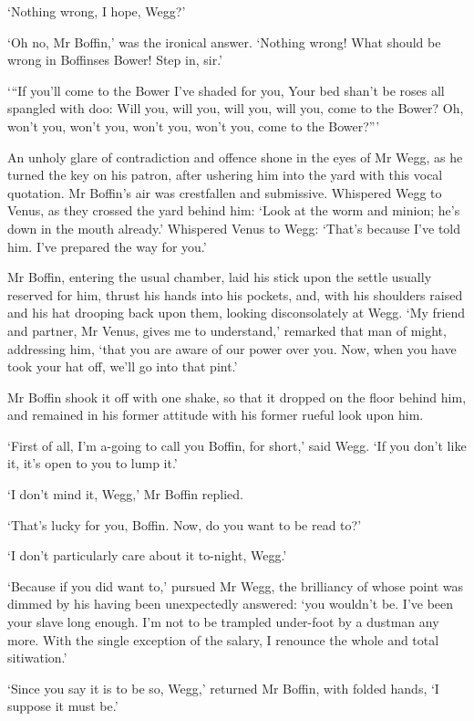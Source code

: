 ‘Nothing wrong, I hope, Wegg?’

‘Oh no, Mr Boffin,’ was the ironical answer. ‘Nothing wrong! What should
be wrong in Boffinses Bower! Step in, sir.’

     ‘“If you’ll come to the Bower I’ve shaded for you,
     Your bed shan’t be roses all spangled with doo:
     Will you, will you, will you, will you, come to the Bower?
     Oh, won’t you, won’t you, won’t you, won’t you, come to the
          Bower?”’

An unholy glare of contradiction and offence shone in the eyes of Mr
Wegg, as he turned the key on his patron, after ushering him into the
yard with this vocal quotation. Mr Boffin’s air was crestfallen and
submissive. Whispered Wegg to Venus, as they crossed the yard behind
him: ‘Look at the worm and minion; he’s down in the mouth already.’
Whispered Venus to Wegg: ‘That’s because I’ve told him. I’ve prepared
the way for you.’

Mr Boffin, entering the usual chamber, laid his stick upon the settle
usually reserved for him, thrust his hands into his pockets, and,
with his shoulders raised and his hat drooping back upon them, looking
disconsolately at Wegg. ‘My friend and partner, Mr Venus, gives me to
understand,’ remarked that man of might, addressing him, ‘that you are
aware of our power over you. Now, when you have took your hat off, we’ll
go into that pint.’

Mr Boffin shook it off with one shake, so that it dropped on the floor
behind him, and remained in his former attitude with his former rueful
look upon him.

‘First of all, I’m a-going to call you Boffin, for short,’ said Wegg.
‘If you don’t like it, it’s open to you to lump it.’

‘I don’t mind it, Wegg,’ Mr Boffin replied.

‘That’s lucky for you, Boffin. Now, do you want to be read to?’

‘I don’t particularly care about it to-night, Wegg.’

‘Because if you did want to,’ pursued Mr Wegg, the brilliancy of whose
point was dimmed by his having been unexpectedly answered: ‘you wouldn’t
be. I’ve been your slave long enough. I’m not to be trampled under-foot
by a dustman any more. With the single exception of the salary, I
renounce the whole and total sitiwation.’

‘Since you say it is to be so, Wegg,’ returned Mr Boffin, with folded
hands, ‘I suppose it must be.’

